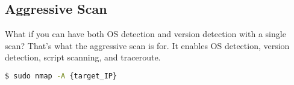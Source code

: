\documentclass[11pt]{article}  %
\newenvironment{commandbox}[1][]{
  \begin{tcolorbox}[
      colback=kalibackground,
      colframe=commandcolor,
      fonttitle=\bfseries\color{white},
      title=#1,
      breakable=true
    ]
  }{
  \end{tcolorbox}
}
\begin{document}
\thispagestyle{empty}

\setcounter{section}{1}
\setcounter{subsection}{3}

\subsection{\huge \color{subsectioncolor}Aggressive Scan}

What if you can have both OS detection and version detection with a
single scan? That's what the aggressive scan is for. It enables OS
detection, version detection, script scanning, and traceroute.

\begin{commandbox}[Aggressive Scan]
\begin{lstlisting}[language=bash, style=bash, basicstyle=\normalsize\ttfamily\color{warningcolor}]
$ sudo nmap -A {target_IP}
\end{lstlisting}


\end{commandbox}
\end{document}
